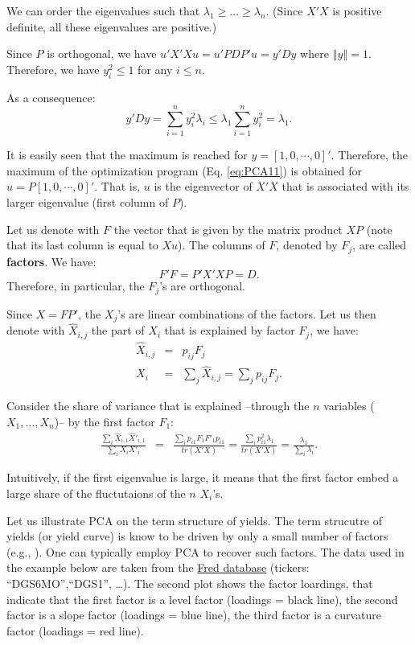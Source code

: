\documentclass[
  12pt,
]{book}
\theoremstyle{definition}
\theoremstyle{definition}
\theoremstyle{definition}
\theoremstyle{definition}
\theoremstyle{remark}
\begin{document}
We can order the eigenvalues such that \(\lambda_{1}\geq\ldots\geq\lambda_{n}\). (Since \(X'X\) is positive definite, all these eigenvalues are positive.)

Since \(P\) is orthogonal, we have \(u'X'Xu=u'PDP'u=y'Dy\) where \(\left\Vert y\right\Vert =1\). Therefore, we have \(y_{i}^{2}\leq 1\) for any \(i\leq n\).

As a consequence:
\[
y'Dy=\sum_{i=1}^{n}y_{i}^{2}\lambda_{i}\leq\lambda_{1}\sum_{i=1}^{n}y_{i}^{2}=\lambda_{1}.
\]

It is easily seen that the maximum is reached for \(y=\left[1,0,\cdots,0\right]'\). Therefore, the maximum of the optimization program (Eq. \eqref{eq:PCA11}) is obtained for \(u=P\left[1,0,\cdots,0\right]'\). That is, \(u\) is the eigenvector of \(X'X\) that is associated with its larger eigenvalue (first column of \(P\)).

Let us denote with \(F\) the vector that is given by the matrix product \(XP\) (note that its last column is equal to \(Xu\)). The columns of \(F\), denoted by \(F_{j}\), are called \textbf{factors}. We have:
\[
F'F=P'X'XP=D.
\]
Therefore, in particular, the \(F_{j}\)'s are orthogonal.

Since \(X=FP'\), the \(X_{j}\)'s are linear combinations of the factors. Let us then denote with \(\hat{X}_{i,j}\) the part of \(X_{i}\) that is explained by factor \(F_{j}\), we have:
\begin{eqnarray*}
\hat{X}_{i,j} & = & p_{ij}F_{j}\\
X_{i} & = & \sum_{j}\hat{X}_{i,j}=\sum_{j}p_{ij}F_{j}.
\end{eqnarray*}

Consider the share of variance that is explained --through the \(n\) variables (\(X_{1},\ldots,X_{n}\))-- by the first factor \(F_{1}\):
\begin{eqnarray*}
\frac{\sum_{i}\hat{X}_{i,1}\hat{X}'_{i,1}}{\sum_{i}X_{i}X'_{i}} & = & \frac{\sum_{i}p_{i1}F_{1}F'_{1}p_{i1}}{tr(X'X)} = \frac{\sum_{i}p_{i1}^{2}\lambda_{1}}{tr(X'X)} = \frac{\lambda_{1}}{\sum_{i}\lambda_{i}}.
\end{eqnarray*}

Intuitively, if the first eigenvalue is large, it means that the first factor embed a large share of the fluctutaions of the \(n\) \(X_{i}\)'s.

Let us illustrate PCA on the term structure of yields. The term strucutre of yields (or yield curve) is know to be driven by only a small number of factors (e.g., \citet{Litterman_Scheinkman_1991}). One can typically employ PCA to recover such factors. The data used in the example below are taken from the \href{https://fred.stlouisfed.org}{Fred database} (tickers: ``DGS6MO'',``DGS1'', \ldots). The second plot shows the factor loardings, that indicate that the first factor is a level factor (loadings = black line), the second factor is a slope factor (loadings = blue line), the third factor is a curvature factor (loadings = red line).
\end{document}
